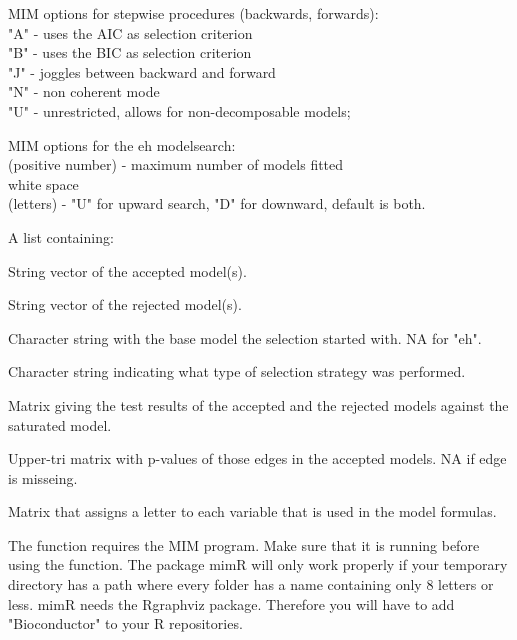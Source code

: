 \begin{Details}\relax
MIM options for stepwise procedures (backwards, forwards):\\
"A" - uses the AIC as selection criterion\\
"B" - uses the BIC as selection criterion\\
"J" - joggles between backward and forward\\
"N" - non coherent mode\\
"U" - unrestricted, allows for non-decomposable models;

MIM options for the eh modelsearch:\\
(positive number) - maximum number of models fitted\\
white space\\
(letters) - "U" for upward search, "D" for downward, default is both.
\end{Details}
\begin{Value}
A list containing:
\begin{ldescription}
\item[\code{"accepted" }] String vector of the accepted model(s). 
\item[\code{"rejected" }] String vector of the rejected model(s). 
\item[\code{"base"}] Character string with the base model the selection started with. NA for "eh". 
\item[\code{"strategy"}] Character string indicating what type of selection strategy was performed. 
\item[\code{"tests against saturated"}] Matrix giving the test results of the accepted and the rejected models against the saturated model.

\item[\code{"p values"}] Upper-tri matrix with p-values of those edges in the accepted models. NA if edge is misseing. 
\item[\code{"variable names"}] Matrix that assigns a letter to each variable that is used in the model formulas. 
\end{ldescription}
\end{Value}
\begin{Note}\relax
The function requires the MIM program.
Make sure that it is running before using the function. The package mimR will only work properly if your temporary directory has a path
where every folder has a name containing only 8 letters or less. mimR needs the Rgraphviz package.
Therefore you will have to add "Bioconductor" to your R repositories.
\end{Note}
